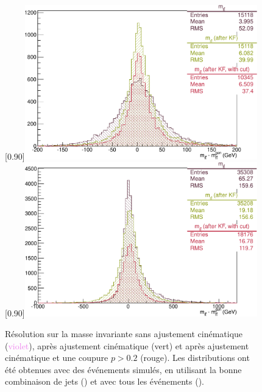\begin{figure}[p] \centering
    \subcaptionbox{\label{fig:kinfit_matched_events}}[0.90\textwidth]{\includegraphics[width=0.90\textwidth]{chapitre6/figs/kinfit/mtt_resolution_with_kinfit_2011_resolutions_good_solutions_on_TTbar.pdf}} \\
    \subcaptionbox{\label{fig:kinfit_all_events}}[0.90\textwidth]{\includegraphics[width=0.90\textwidth]{chapitre6/figs/kinfit/mtt_resolution_with_kinfit_2011_resolutions_on_TTbar.pdf}}
    \caption{Résolution sur la masse invariante \mtt sans ajustement cinématique (\textcolor{violet}{violet}), après ajustement cinématique (\textcolor{vert}{vert}) et après ajustement cinématique et une coupure $p > 0.2$ (\textcolor{rouge_grandmere}{rouge}). Les distributions ont été obtenues avec des événements \ttbar simulés, en utilisant la bonne combinaison de jets () et avec tous les événements ().}
    \label{fig:kinfit_ttbar}
\end{figure}


